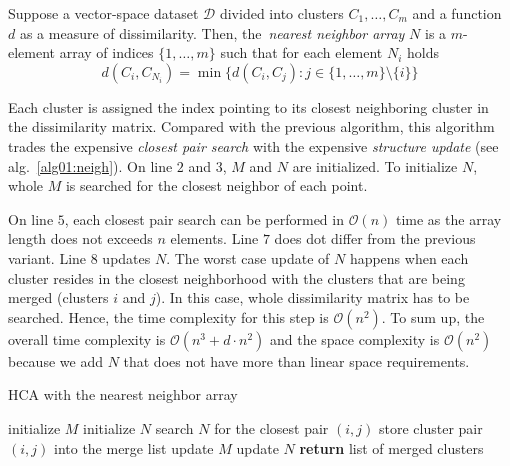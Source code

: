 \begin{defn}
	Suppose a vector-space dataset $\mathcal{D}$ divided into clusters $C_1,\dots,C_m$ and a function $d$ as a measure of dissimilarity. Then, the~\emph{nearest neighbor array} $N$ is a $m$-element array of indices $\{1,\dots,m\}$ such that for each element $N_i$ holds
	$$d(C_i,C_{N_i}) = \min\{d(C_i,C_j) : j \in \{1,\dots,m\} \setminus \{i\}\}$$
	\label{def01:neigh}
\end{defn}

Each cluster is assigned the index pointing to its closest neighboring cluster in the dissimilarity matrix. 
Compared with the previous algorithm, this algorithm trades the expensive \emph{closest pair search} with the expensive \emph{structure update}  (see alg.~\ref{alg01:neigh}). On line $2$ and $3$, $M$ and $N$ are initialized. To initialize $N$, whole $M$ is searched for the closest neighbor of each point. 

On line $5$, each closest pair search can be performed in $\mathcal{O}(n)$ time as the array length does not exceeds $n$ elements. Line $7$ does dot differ from the previous variant. Line $8$ updates $N$. The worst case update of $N$ happens when each cluster resides in the closest neighborhood with the clusters that are being merged (clusters $i$  and $j$). In this case, whole dissimilarity matrix has to be searched. Hence, the time complexity for this step is $\mathcal{O}(n^2)$. To sum up, the overall time complexity is $\mathcal{O}(n^3+d\cdot n^2)$ and the space complexity is $\mathcal{O}(n^2)$ because we add $N$ that does not have more than linear space requirements.



\begin{algorithm}[t]
	\caption{HCA with the nearest neighbor array}
	\label{alg01:neigh}
	\begin{algorithmic}[1]
		\State initialize $M$ 
		\State initialize $N$ 
		\State search $N$ for the closest pair $(i,j)$ 
		\State store cluster pair $(i,j)$ into the merge list 
		\State update $M$ 
		\State update $N$ 
		\EndFor
		\State \textbf{return} list of merged clusters
		\EndProcedure
	\end{algorithmic}
\end{algorithm}

